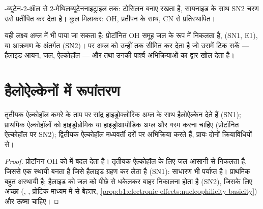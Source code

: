 \begin{omfigure}

{\small {}-ब्यूटेन-2-ऑल से 2-मेथिलब्यूटेननाइट्राइल तक: टोसिलन
 बनाए रखता है, सायनाइड के साथ SN2 चरण उसे प्रतीपित कर देता है। कुल मिलाकर:
OH, प्रतीपन के साथ, CN से प्रतिस्थापित।}
\end{omfigure}

यही लक्ष्य अम्ल में भी पाया जा सकता है: प्रोटॉनित OH समूह
जल के रूप में निकलता है,  (SN1, E1), या आक्रमण के अंतर्गत (SN2)। पर अम्ल
 को उन्हीं तक सीमित कर देता है जो उसमें टिक सकें --- हैलाइड आयन, जल,
ऐल्कोहॉल --- और  तथा उनकी पार्श्व अभिक्रियाओं का द्वार खोल देता है।

\section{हैलोऐल्केनों में रूपांतरण}

\begin{proposition}[ऐल्कोहॉल और हाइड्रोजन हैलाइड]\label{prop:b1:alcohol-activation:hx-by-class}
तृतीयक ऐल्कोहॉल कमरे के ताप पर सांद्र हाइड्रोक्लोरिक
अम्ल के साथ हैलोऐल्केन देते हैं (SN1); प्राथमिक ऐल्कोहॉलों को हाइड्रोब्रोमिक या
हाइड्रोआयोडिक अम्ल और गरम करना चाहिए (प्रोटॉनित ऐल्कोहॉल पर SN2); द्वितीयक
ऐल्कोहॉल मध्यवर्ती दरों पर अभिक्रिया करते हैं, प्रायः दोनों क्रियाविधियों से।
\end{proposition}

\begin{proof}
प्रोटॉनन OH को  में बदल देता है। तृतीयक ऐल्कोहॉल के लिए जल
आसानी से निकलता है, जिससे एक स्थायी  बनता है जिसे हैलाइड ग्रहण कर लेता है (SN1): साधारण
  भी पर्याप्त है। प्राथमिक  बहुत
अस्थायी है; हैलाइड को जल को पीछे से धकेलकर बाहर निकालना होता है (SN2), जिसके लिए
अच्छा  (, , प्रोटिक माध्यम में  से बेहतर,
\cref{prop:b1:electronic-effects:nucleophilicity-basicity}) और ऊष्मा चाहिए।
\end{proof}


